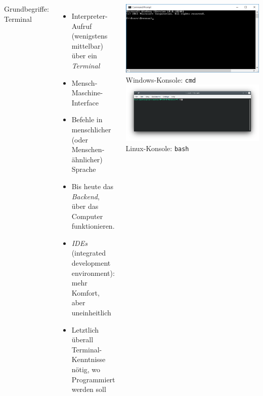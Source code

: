\begin{frame}
%
\begin{columns}[T]
\begin{Large}
{Grundbegriffe: Terminal}
\end{Large}
\begin{itemize}
\item Interpreter-Aufruf (wenigstens mittelbar) über ein \emph{Terminal}
\item Mensch-Maschine-Interface
\item Befehle in menschlicher (oder Menschen-ähnlicher) Sprache
\item Bis heute das \emph{Backend}, über das Computer funktionieren.
\item \emph{IDEs} (integrated development environment): mehr Komfort, aber uneinheitlich
\item Letztlich überall Terminal-Kenntnisse nötig, wo Programmiert werden soll
\end{itemize}
%
\includegraphics[width=\linewidth]{./gfx/cmd}
{\tiny Windows-Konsole: \texttt{cmd}}
\includegraphics[width=\linewidth]{./gfx/bash}
{\tiny Linux-Konsole: \texttt{bash}}
\end{columns}
%
\end{frame}



